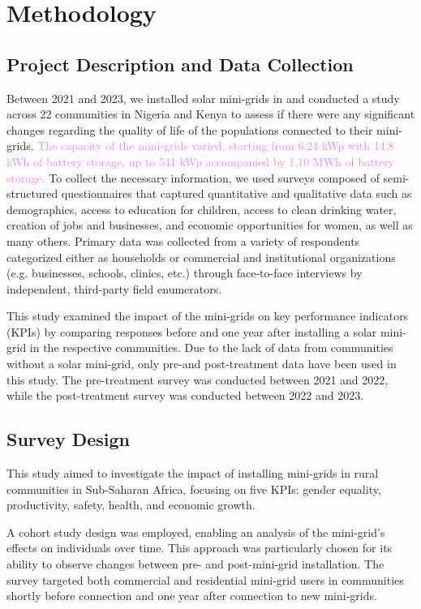 \section{Methodology}
\label{sec:methodology}
\subsection{Project Description and Data Collection}
Between 2021 and 2023, we installed solar mini-grids in and conducted a study across 22 communities in Nigeria and Kenya to assess if there were any significant changes regarding the quality of life of the populations connected to their mini-grids. \textcolor{violet}{The capacity of the mini-grids varied, starting from 6.24 kWp with 14.8 kWh of battery storage, up to 541 kWp accompanied by 1.10 MWh of battery storage.} To collect the necessary information, we used surveys composed of semi-structured questionnaires that captured quantitative and qualitative data such as demographics, access to education for children, access to clean drinking water, creation of jobs and businesses, and economic opportunities for women, as well as many others. Primary data was collected from a variety of respondents categorized either as households or commercial and institutional organizations (e.g. businesses, schools, clinics, etc.) through face-to-face interviews by independent, third-party field enumerators.

This study examined the impact of the mini-grids on key performance indicators (KPIs) by comparing responses before and one year after installing a solar mini-grid in the respective communities. Due to the lack of data from communities without a solar mini-grid, only pre-and post-treatment data have been used in this study. The pre-treatment survey was conducted between 2021 and 2022, while the post-treatment survey was conducted between 2022 and 2023.

\subsection{Survey Design} 
This study aimed to investigate the impact of installing mini-grids in rural communities in Sub-Saharan Africa, focusing on five KPIs: gender equality, productivity, safety, health, and economic growth.

A cohort study design was employed, enabling an analysis of the mini-grid's effects on individuals over time. This approach was particularly chosen for its ability to observe changes between pre- and post-mini-grid installation. The survey targeted both commercial and residential mini-grid users in communities shortly before connection and one year after connection to new mini-grids.

